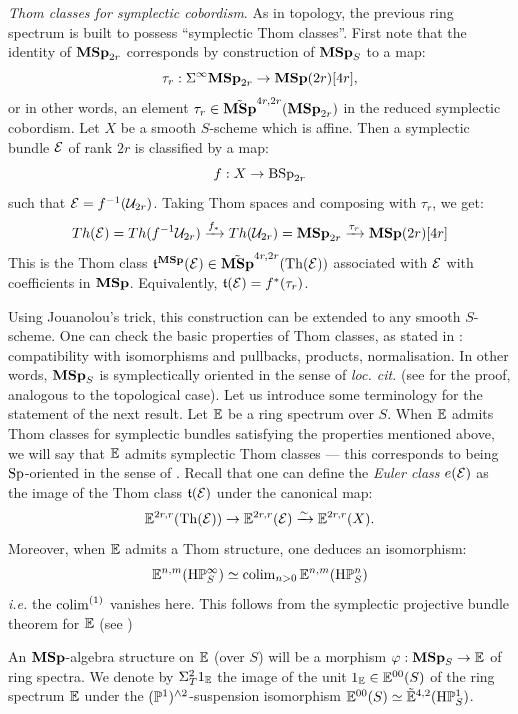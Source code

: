 \begin{num}\label{num:symplectic_Thom_Grass_Euler}
 \textit{Thom classes for symplectic cobordism}.
As in topology, the previous ring spectrum is built to possess ``symplectic Thom classes''.
 First note that the identity of $\mathbf{MSp}_{2r}$ corresponds by construction of $\mathbf{MSp}_S$
 to a map:
\[
\tau_r:\Sigma^{\infty}\mathbf{MSp}_{2r}\to \mathbf{MSp}(2r)[4r],
\]
or in other words, an element $\tau_r \in \tilde {\mathbf{MSp}}^{4r,2r}(\mathbf{MSp}_{2r})$
 in the reduced symplectic cobordism.
 Let $X$ be a smooth $S$-scheme which is affine.
 Then a symplectic bundle $\mathcal E$ of rank $2r$ is classified by a map:
\[
f:X\to \mathrm{BSp}_{2r}
\] 
such that $\mathcal E=f^{-1}(\mathcal U_{2r})$. Taking Thom spaces and composing with $\tau_r$, we get:
\[
Th(\mathcal E)=Th(f^{-1}\mathcal U_{2r}) \xrightarrow{f_*} Th(\mathcal U_{2r})=\mathbf{MSp}_{2r} \xrightarrow{\tau_r} \mathbf{MSp}(2r)[4r]
\]
This is the Thom class $\mathfrak{t}^{\mathbf{MSp}}(\mathcal E) \in \tilde {\mathbf{MSp}}^{4r,2r}(\operatorname{Th}(\mathcal E))$
 associated with $\mathcal E$
 with coefficients in $\mathbf{MSp}$. Equivalently, $\mathfrak{t}(\mathcal E)=f^*(\tau_r)$.

Using Jouanolou's trick, this construction can be extended to any smooth $S$-scheme.
 One can check the basic properties of Thom classes, as stated in \cite[Def. 2.1.3, $G=\Sp_*$]{DF3}:
 compatibility with isomorphisms and pullbacks, products, normalisation.
 In other words, $\mathbf{MSp}_S$ is symplectically oriented in the sense of \emph{loc. cit.}
 (see \cite[, Th. 1.1]{PWcobord} for the proof, analogous to the
 topological case).
Let us introduce some terminology for the statement of the next result.
 Let $\mathbb E$ be a ring spectrum over $S$.
 When $\mathbb E$ admits Thom classes for symplectic bundles satisfying the properties
 mentioned above, we will say that $\mathbb E$ admits symplectic Thom classes --- this corresponds
 to being $\mathrm{Sp}$-oriented in the sense of \cite[Def. 2.1.3]{DF3}.
 Recall that one can define the \emph{Euler class} $e(\mathcal E)$ as the image of the Thom class $\mathfrak{t}(\mathcal E)$
 under the canonical map:
$$
\mathbb E^{2r,r}(\operatorname{Th}(\mathcal E)) \rightarrow \mathbb E^{2r,r}(\mathcal E) \xrightarrow{\sim} \mathbb E^{2r,r}(X).
$$
Moreover, when $\mathbb E$ admits a Thom structure, one deduces an isomorphism:
\begin{equation}\label{coh_HPinfty}
\mathbb E^{n,m}(\mathrm{H}\mathbb P^\infty_S) \simeq \operatorname{colim}_{n>0} \mathbb E^{n,m}(\mathrm{H}\mathbb P^n_S)
\end{equation}
\emph{i.e.} the $\operatorname{colim}^{(1)}$ vanishes here.
 This follows from the symplectic projective bundle theorem for $\mathbb E$
 (see \cite[Th. 2.2.3]{DF3})

An $\mathbf{MSp}$-algebra structure on $\mathbb E$ (over $S$) will be a morphism $\varphi:\mathbf{MSp}_S\rightarrow \mathbb E$
 of ring spectra.
 We denote by $\Sigma_T^2 1_\mathbb E$ the image of the unit $1_\mathbb E \in \mathbb E^{00}(S)$ of the ring spectrum $\mathbb E$
 under the $(\mathbb P^1)^{\wedge 2}$-suspension isomorphism $\mathbb E^{00}(S) \simeq \tilde {\mathbb E}^{4,2}(\mathrm{H}\mathbb P^1_S)$.
\end{num}
